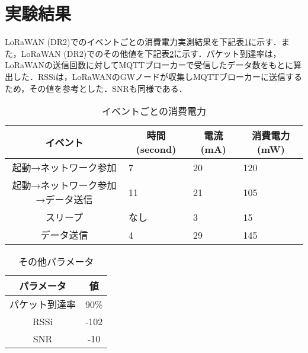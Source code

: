 \section{実験結果}
LoRaWAN (DR2)でのイベントごとの消費電力実測結果を下記表\ref{fig:LoRaWAN_PowerConsumption}に示す．また，LoRaWAN (DR2)でのその他値を下記表\ref{fig:LoRaWAN_Parameter}に示す．パケット到達率は，LoRaWANの送信回数に対してMQTTブローカーで受信したデータ数をもとに算出した．RSSiは，LoRaWANのGWノードが収集しMQTTブローカーに送信するため，その値を参考とした．SNRも同様である．

\begin{table}[]
    \caption{イベントごとの消費電力}\label{fig:LoRaWAN_PowerConsumption}
    \centering
    \begin{tabular}{|c|l|l|l|}
    \hline
    \textbf{イベント}     & \multicolumn{1}{c|}{\textbf{時間 (second)}} & \multicolumn{1}{c|}{\textbf{電流 (mA)}} & \multicolumn{1}{c|}{\textbf{消費電力 (mW)}} \\ \hline
    起動→ネットワーク参加       & 7                                         & 20                                    & 120                                     \\ \hline
    起動→ネットワーク参加→データ送信 & 11                                        & 21                                    & 105                                     \\ \hline
    スリープ              & なし                                        & 3                                     & 15                                      \\ \hline
    データ送信             & 4                                         & 29                                    & 145                                     \\ \hline
    \end{tabular}
\end{table}

\begin{table}[]
    \caption{その他パラメータ}\label{fig:LoRaWAN_Parameter}
    \centering
    \begin{tabular}{|c|c|}
    \hline
    \textbf{パラメータ} & \textbf{値} \\ \hline
    パケット到達率        & 90\%       \\ \hline
    RSSi           & -102       \\ \hline
    SNR            & -10        \\ \hline
    \end{tabular}
\end{table}